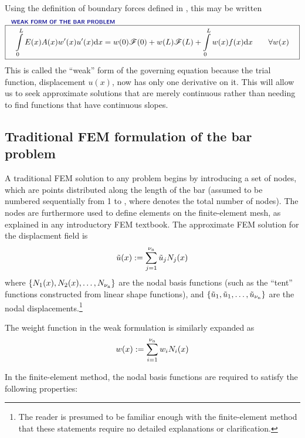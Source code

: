 Using the definition of boundary forces defined in , this may be written
\begin{equation}
\overset{\text{\Defn{WEAK FORM OF THE BAR PROBLEM}\hspace{8cm}}}{\boxit{\quad
 \int\limits_0^L E(x)A(x) w'(x)u'(x)\dd x = w(0)\tractionForce(0)+w(L)\tractionForce(L)  +  \int\limits_0^L w(x)f(x)\dd x
\qquad\forall w(x)
\quad}}
\label{eq:LinearBarWeakFormWithForcesc}
\end{equation}
This is called the ``weak'' form of the governing equation because the trial function, displacement $u(x)$, now has only one derivative on it. This will allow us to seek approximate solutions that are merely continuous rather than needing to find functions that have continuous slopes.



\subsection{Traditional FEM formulation of the bar problem}
\label{sec:LinearBarFEM}
A traditional FEM solution to any \oneD problem begins by introducing a set of nodes, which are points distributed along the length of the bar (assumed to be numbered sequentially from 1 to \numnodes, where \numnodes denotes the total number of nodes).  The nodes are furthermore used to define elements on the finite-element mesh, as explained in any introductory FEM textbook.   
The approximate FEM solution for the displacment field is
\begin{equation}
  \tilde{u}(x):=\sum\limits_{j=1}^{{\nu_\text{n}}}\tilde{u}_j {N}_j(x)
\label{eq:aprxuc}
\end{equation}
where $\{{N}_1(x),{N}_2(x),\ldots,{N}_{\nu_\text{n}}\}$ are the nodal basis functions (such as the ``tent'' functions constructed from linear shape functions), and $\{\tilde{u}_1, \tilde{u}_1, \ldots, \tilde{u}_{\nu_\text{n}}\}$  
are the nodal displacements.\footnote{The reader is presumed to be familiar enough with the finite-element method that these statements require no detailed explanations or clarification.}

The weight function in the weak formulation is similarly expanded as
\begin{equation}
  w(x):=\sum\limits_{i=1}^{{\nu_\text{n}}}w_i {N}_i(x)
\label{eq:weightc}
\end{equation}

In the finite-element method, the nodal basis functions are required to satisfy the following properties:

